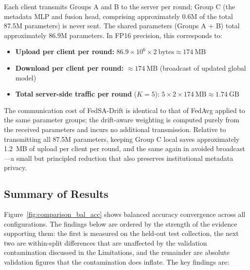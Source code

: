 \documentclass{ieeeaccess}
\newcommand{\sadrift}{FedSA-Drift}
\begin{document}
Each client transmits Groups A and B to the server per round; Group C (the metadata MLP and fusion head, comprising approximately 0.6M of the total 87.5M parameters) is never sent. The shared parameters (Groups A + B) total approximately 86.9M parameters. In FP16 precision, this corresponds to:

\begin{itemize}
    \item \textbf{Upload per client per round:} $86.9 \times 10^6 \times 2~\text{bytes} \approx 174~\text{MB}$
    \item \textbf{Download per client per round:} $\approx 174~\text{MB}$ (broadcast of updated global model)
    \item \textbf{Total server-side traffic per round} ($K{=}5$): $5 \times 2 \times 174~\text{MB} \approx 1.74~\text{GB}$
\end{itemize}

The communication cost of \sadrift{} is identical to that of FedAvg applied to the same parameter groups; the drift-aware weighting is computed purely from the received parameters and incurs no additional transmission. Relative to transmitting all 87.5M parameters, keeping Group C local saves approximately 1.2~MB of upload per client per round, and the same again in avoided broadcast—a small but principled reduction that also preserves institutional metadata privacy.

\subsection{Summary of Results}

Figure~\ref{fig:comparison_bal_acc} shows balanced accuracy convergence across all configurations. The findings below are ordered by the strength of the evidence supporting them: the first is measured on the held-out test collection, the next two are within-split differences that are unaffected by the validation contamination discussed in the Limitations, and the remainder are absolute validation figures that the contamination does inflate. The key findings are:
\end{document}
